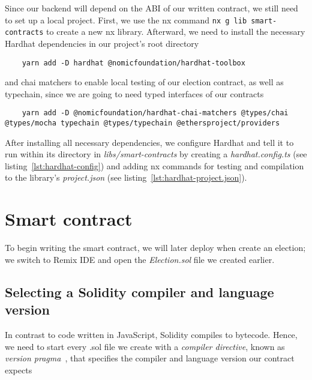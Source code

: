 Since our backend will depend on the \gls{ABI} of our written contract, we still need to set up a local project.
First, we use the nx command \texttt{nx g lib smart-contracts} to create a new nx library.
Afterward, we need to install the necessary Hardhat dependencies in our project's root directory

\begin{verbatim}
    yarn add -D hardhat @nomicfoundation/hardhat-toolbox
\end{verbatim}

and chai matchers to enable local testing of our election contract, as well as typechain, since we are going to need typed interfaces of our contracts

\begin{verbatim}
    yarn add -D @nomicfoundation/hardhat-chai-matchers @types/chai @types/mocha typechain @types/typechain @ethersproject/providers
\end{verbatim}

After installing all necessary dependencies, we configure Hardhat and tell it to run within its directory in \emph{libs/smart-contracts} by creating a \emph{hardhat.config.ts} (see listing~\ref{lst:hardhat-config}) and adding nx commands for testing and compilation to the library's \emph{project.json} (see listing~\ref{lst:hardhat-project.json}).


\section{Smart contract}\label{sec:smart-contract}

To begin writing the smart contract, we will later deploy when  create an election; we switch to Remix \gls{IDE} and open the \emph{Election.sol} file we created earlier.

\subsection{Selecting a Solidity compiler and language version}\label{subsec:selecting-a-solidity-compiler-and-language-version}

In contrast to code written in JavaScript, Solidity compiles to bytecode.
Hence, we need to start every .sol file we create with a \emph{compiler directive}, known as \emph{version pragma}~\autocite[135]{antonopoulos_mastering_2019}, that specifies the compiler and language version our contract expects

